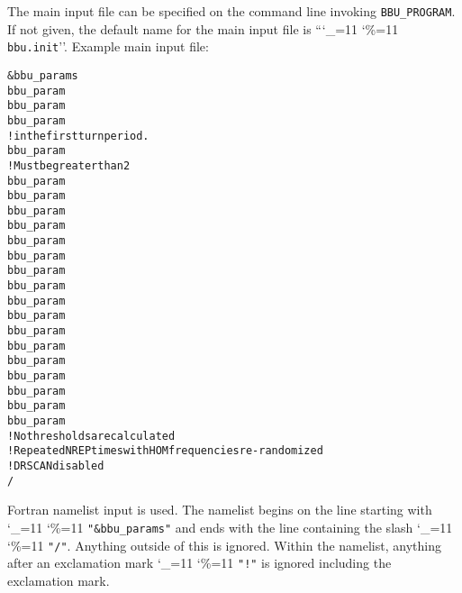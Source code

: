\documentclass[11pt]{article}
\newcommand{\bbup}{\texttt{BBU_PROGRAM}\xspace}
\newcommand\ttcmd{\begingroup\catcode`\_=11 \catcode`\%=11 \dottcmd}
\newcommand\dottcmd[1]{\texttt{#1}\endgroup}
\newcommand{\vn}{\ttcmd}
\newlength{\ExBeg}
\newlength{\ExEnd}
\newenvironment{example}
  {\vspace{\ExBeg} \begin{alltt}}
  {\end{alltt} \vspace{\ExEnd}}
\begin{document}
The main input file can be specified on the command line invoking {\bbup}.
If not given, the default name for the main input file is ``\vn{bbu.init}''.
Example main input file:
\begin{example}
&bbu_params
  bbu_param%
  bbu_param%
  bbu_param%
                                              ! in the first turn period.
  bbu_param%
                                              ! Must be greater than 2
  bbu_param%
  bbu_param%
  bbu_param%
  bbu_param%
  bbu_param%
  bbu_param%
  bbu_param%
  bbu_param%
  bbu_param%
  bbu_param%
  bbu_param%
  bbu_param%
  bbu_param%
  bbu_param%
  bbu_param%
  bbu_param%
  bbu_param%
                                              ! No thresholds are calculated
                                              ! Repeated NREP times with HOM frequencies re-randomized
                                              ! DRSCAN disabled
/
\end{example}
Fortran namelist input is used.
The namelist begins on the line starting with \vn{"\&bbu_params"}
and ends with the line containing the slash \vn{"/"}. Anything outside
of this is ignored. Within the namelist, anything after an exclamation
mark \vn{"!"} is ignored including the exclamation mark. 
\end{document}
